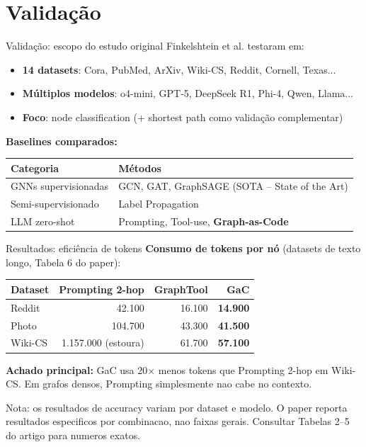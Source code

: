 \documentclass{beamer}
\begin{document}
\section*{Validação}
\begin{frame}{Validação: escopo do estudo original}
  Finkelshtein et al. testaram em:
  \begin{itemize}
    \item \textbf{14 datasets}: Cora, PubMed, ArXiv, Wiki-CS, Reddit, Cornell, Texas...
    \item \textbf{Múltiplos modelos}: o4-mini, GPT-5, DeepSeek R1, Phi-4, Qwen, Llama...
    \item \textbf{Foco}: node classification (+ shortest path como validação complementar)
  \end{itemize}

  \vspace{0.5em}
  \textbf{Baselines comparados:}
  \begin{table}
    \centering
    \footnotesize
    \begin{tabular}{ll}
      \toprule
      Categoria & Métodos \\
      \midrule
      GNNs supervisionadas & GCN, GAT, GraphSAGE (SOTA -- State of the Art) \\
      Semi-supervisionado & Label Propagation \\
      LLM zero-shot & Prompting, Tool-use, \textbf{Graph-as-Code} \\
      \bottomrule
    \end{tabular}
  \end{table}
\end{frame}

\begin{frame}{Resultados: eficiência de tokens}
  \textbf{Consumo de tokens por nó} (datasets de texto longo, Tabela 6 do paper):
  \begin{table}
    \centering
    \footnotesize
    \begin{tabular}{lrrr}
      \toprule
      Dataset & Prompting 2-hop & GraphTool & \textbf{GaC} \\
      \midrule
      Reddit & 42.100 & 16.100 & \textbf{14.900} \\
      Photo & 104.700 & 43.300 & \textbf{41.500} \\
      Wiki-CS & 1.157.000 (estoura) & 61.700 & \textbf{57.100} \\
      \bottomrule
    \end{tabular}
  \end{table}

  \vspace{0.5em}
  \textbf{Achado principal:} GaC usa 20$\times$ menos tokens que Prompting 2-hop em Wiki-CS. Em grafos densos, Prompting simplesmente nao cabe no contexto.

  \vspace{0.3em}
  {\footnotesize Nota: os resultados de accuracy variam por dataset e modelo. O paper reporta resultados especificos por combinacao, nao faixas gerais. Consultar Tabelas 2--5 do artigo para numeros exatos.}
\end{frame}
\end{document}
